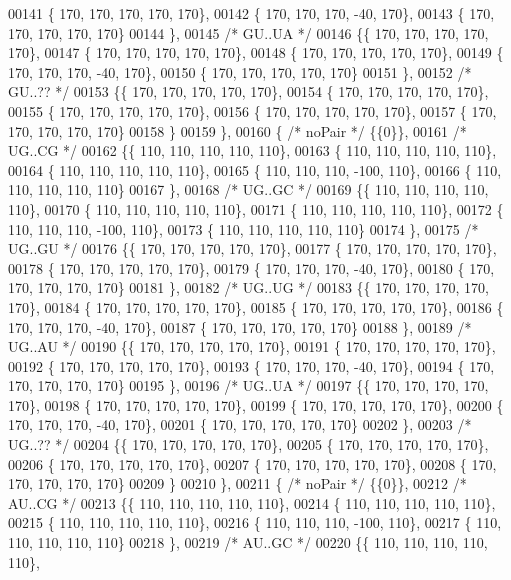 \begin{DoxyCode}
00141 \{ 170, 170, 170, 170, 170\},
00142 \{ 170, 170, 170, -40, 170\},
00143 \{ 170, 170, 170, 170, 170\}
00144 \},
00145 \textcolor{comment}{/* GU..UA */}
00146 \{\{ 170, 170, 170, 170, 170\},
00147 \{ 170, 170, 170, 170, 170\},
00148 \{ 170, 170, 170, 170, 170\},
00149 \{ 170, 170, 170, -40, 170\},
00150 \{ 170, 170, 170, 170, 170\}
00151 \},
00152 \textcolor{comment}{/* GU..?? */}
00153 \{\{ 170, 170, 170, 170, 170\},
00154 \{ 170, 170, 170, 170, 170\},
00155 \{ 170, 170, 170, 170, 170\},
00156 \{ 170, 170, 170, 170, 170\},
00157 \{ 170, 170, 170, 170, 170\}
00158 \}
00159 \},
00160 \{ \textcolor{comment}{/* noPair */} \{\{0\}\},
00161 \textcolor{comment}{/* UG..CG */}
00162 \{\{ 110, 110, 110, 110, 110\},
00163 \{ 110, 110, 110, 110, 110\},
00164 \{ 110, 110, 110, 110, 110\},
00165 \{ 110, 110, 110, -100, 110\},
00166 \{ 110, 110, 110, 110, 110\}
00167 \},
00168 \textcolor{comment}{/* UG..GC */}
00169 \{\{ 110, 110, 110, 110, 110\},
00170 \{ 110, 110, 110, 110, 110\},
00171 \{ 110, 110, 110, 110, 110\},
00172 \{ 110, 110, 110, -100, 110\},
00173 \{ 110, 110, 110, 110, 110\}
00174 \},
00175 \textcolor{comment}{/* UG..GU */}
00176 \{\{ 170, 170, 170, 170, 170\},
00177 \{ 170, 170, 170, 170, 170\},
00178 \{ 170, 170, 170, 170, 170\},
00179 \{ 170, 170, 170, -40, 170\},
00180 \{ 170, 170, 170, 170, 170\}
00181 \},
00182 \textcolor{comment}{/* UG..UG */}
00183 \{\{ 170, 170, 170, 170, 170\},
00184 \{ 170, 170, 170, 170, 170\},
00185 \{ 170, 170, 170, 170, 170\},
00186 \{ 170, 170, 170, -40, 170\},
00187 \{ 170, 170, 170, 170, 170\}
00188 \},
00189 \textcolor{comment}{/* UG..AU */}
00190 \{\{ 170, 170, 170, 170, 170\},
00191 \{ 170, 170, 170, 170, 170\},
00192 \{ 170, 170, 170, 170, 170\},
00193 \{ 170, 170, 170, -40, 170\},
00194 \{ 170, 170, 170, 170, 170\}
00195 \},
00196 \textcolor{comment}{/* UG..UA */}
00197 \{\{ 170, 170, 170, 170, 170\},
00198 \{ 170, 170, 170, 170, 170\},
00199 \{ 170, 170, 170, 170, 170\},
00200 \{ 170, 170, 170, -40, 170\},
00201 \{ 170, 170, 170, 170, 170\}
00202 \},
00203 \textcolor{comment}{/* UG..?? */}
00204 \{\{ 170, 170, 170, 170, 170\},
00205 \{ 170, 170, 170, 170, 170\},
00206 \{ 170, 170, 170, 170, 170\},
00207 \{ 170, 170, 170, 170, 170\},
00208 \{ 170, 170, 170, 170, 170\}
00209 \}
00210 \},
00211 \{ \textcolor{comment}{/* noPair */} \{\{0\}\},
00212 \textcolor{comment}{/* AU..CG */}
00213 \{\{ 110, 110, 110, 110, 110\},
00214 \{ 110, 110, 110, 110, 110\},
00215 \{ 110, 110, 110, 110, 110\},
00216 \{ 110, 110, 110, -100, 110\},
00217 \{ 110, 110, 110, 110, 110\}
00218 \},
00219 \textcolor{comment}{/* AU..GC */}
00220 \{\{ 110, 110, 110, 110, 110\},

\end{DoxyCode}
